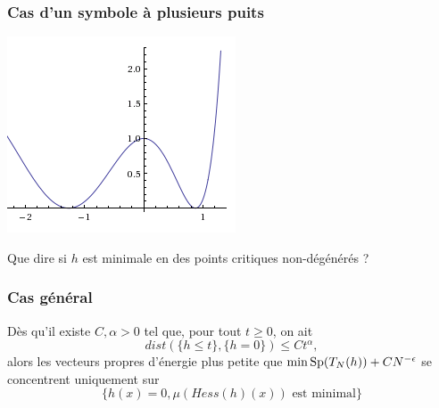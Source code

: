 \documentclass[mathserif]{beamer}
\begin{document}
\begin{frame}
  \frametitle{Cas d'un symbole à plusieurs puits}
   \begin{minipage}[l]{0.3\linewidth}
     \includegraphics[width=\linewidth]{wells.png}
   \end{minipage}
   \begin{minipage}[r]{0.65\linewidth}
     Que dire si $h$ est minimale en des points critiques non-dégénérés
     ?
     \end{minipage}
\end{frame}

\begin{frame}
  \frametitle{Cas g\'en\'eral}
  \begin{thm}[D.]
    D\`es qu'il existe $C,\alpha>0$ tel que, pour tout $t\geq 0$, on ait
    \[
      dist(\{h\leq t\},\{h=0\})\leq Ct^{\alpha},
    \]
    alors les vecteurs propres d'énergie plus petite que $\min
    \operatorname{Sp}(T_N(h))+CN^{-\epsilon}$ se concentrent uniquement sur
    \[
      \{h(x)=0, \mu(Hess(h)(x))\text{ est minimal}\}
    \]
  \end{thm}
\end{frame}
\end{document}
